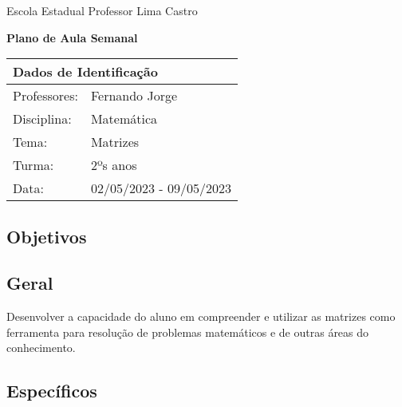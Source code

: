 \documentclass[oneside,a4paper,12pt]{article}
\newcommand{\universidade}{Escola Estadual Professor Lima Castro}
\newcommand{\professores}{Fernando Jorge}
\newcommand{\disciplina}{Matemática}
\newcommand{\tema}{Matrizes}
\newcommand{\turma}{2ºs anos}
\newcommand{\data}{02/05/2023 - 09/05/2023}
\begin{document}
  \pagestyle{empty}

	\begin{center}
	
	  \universidade
	  \par
	  \vspace{10pt}
	  \LARGE \textbf{Plano de Aula Semanal}

	\end{center}

  \vspace{10pt}

	\begin{tabular}{ |l|p{12cm}| }

	  \hline
	  \multicolumn{2}{|l|}{\textbf{Dados de Identificação}} \\
	  \hline
	  Professores:         &    \professores           \\
	  \hline
	  Disciplina:        &    \disciplina          \\
	  \hline
	  Tema:              &    \tema                \\
	  \hline
	  Turma:             &    \turma               \\
	  \hline
	  Data:              &    \data                \\
	  \hline

	\end{tabular}

  \begin{snugshade}
  \section{Objetivos} %
  \end{snugshade}
  
  \subsection{Geral} %
  
  Desenvolver a capacidade do aluno em compreender e utilizar as matrizes como ferramenta para resolução de problemas matemáticos e de outras áreas do conhecimento.
    
  \subsection{Específicos} %
    
\end{document}
